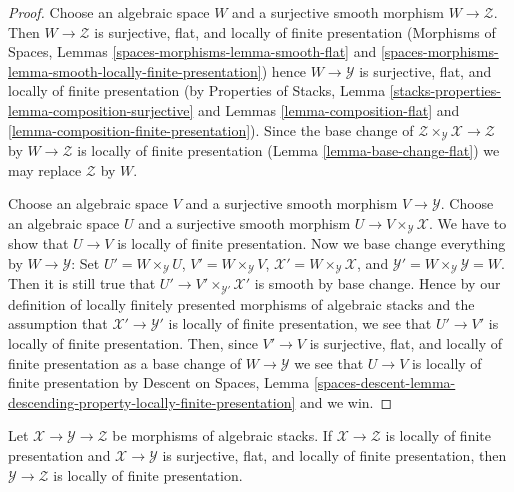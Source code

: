 \begin{proof}
Choose an algebraic space $W$ and a surjective smooth morphism
$W \to \mathcal{Z}$. Then $W \to \mathcal{Z}$ is surjective, flat,
and locally of finite presentation
(Morphisms of Spaces, Lemmas
\ref{spaces-morphisms-lemma-smooth-flat} and
\ref{spaces-morphisms-lemma-smooth-locally-finite-presentation})
hence $W \to \mathcal{Y}$ is surjective, flat, and locally of finite
presentation (by
Properties of Stacks, Lemma
\ref{stacks-properties-lemma-composition-surjective}
and
Lemmas \ref{lemma-composition-flat} and
\ref{lemma-composition-finite-presentation}).
Since the base change of
$\mathcal{Z} \times_\mathcal{Y} \mathcal{X} \to \mathcal{Z}$
by $W \to \mathcal{Z}$ is
locally of finite presentation
(Lemma \ref{lemma-base-change-flat})
we may replace $\mathcal{Z}$ by $W$.

\medskip\noindent
Choose an algebraic space $V$ and a surjective smooth morphism
$V \to \mathcal{Y}$. Choose an algebraic space $U$ and a surjective
smooth morphism $U \to V \times_\mathcal{Y} \mathcal{X}$.
We have to show that $U \to V$ is locally of finite presentation.
Now we base change everything by $W \to \mathcal{Y}$: Set
$U' = W \times_\mathcal{Y} U$,
$V' = W \times_\mathcal{Y} V$,
$\mathcal{X}' = W \times_\mathcal{Y} \mathcal{X}$,
and $\mathcal{Y}' = W \times_\mathcal{Y} \mathcal{Y} = W$.
Then it is still true that $U' \to V' \times_{\mathcal{Y}'} \mathcal{X}'$
is smooth by base change. Hence by our definition of locally finitely
presented morphisms of algebraic stacks and the assumption that
$\mathcal{X}' \to \mathcal{Y}'$ is locally of finite presentation,
we see that $U' \to V'$ is locally of finite presentation. Then, since
$V' \to V$ is surjective, flat, and locally of finite presentation
as a base change of $W \to \mathcal{Y}$ we see that $U \to V$ is
locally of finite presentation by
Descent on Spaces, Lemma
\ref{spaces-descent-lemma-descending-property-locally-finite-presentation}
and we win.
\end{proof}

\begin{lemma}
\label{lemma-flat-finite-presentation-permanence}
Let $\mathcal{X} \to \mathcal{Y} \to \mathcal{Z}$ be morphisms of
algebraic stacks. If $\mathcal{X} \to \mathcal{Z}$ is locally of finite
presentation and $\mathcal{X} \to \mathcal{Y}$ is surjective, flat, and
locally of finite presentation, then $\mathcal{Y} \to \mathcal{Z}$
is locally of finite presentation.
\end{lemma}

